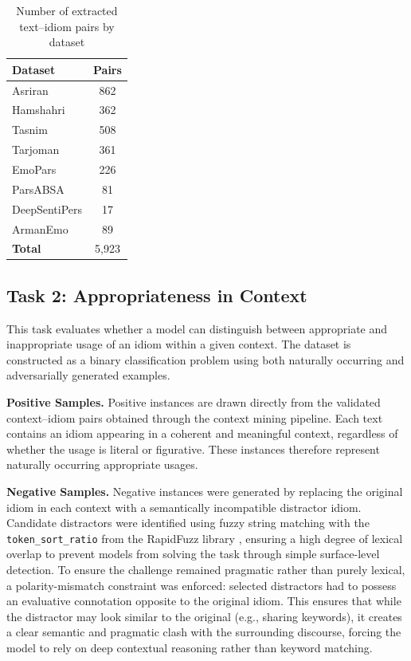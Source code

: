 \documentclass[11pt,a4paper]{article}
\begin{document}
\begin{table}[htbp]
\centering
\caption{Number of extracted text–idiom pairs by dataset}
\label{tab:context_pairs}
\begin{tabular}{lc}
\toprule
\textbf{Dataset} & \textbf{Pairs} \\
\midrule
Asriran & 862 \\
Hamshahri & 362 \\
Tasnim & 508 \\
Tarjoman & 361 \\
EmoPars & 226 \\
ParsABSA & 81 \\
DeepSentiPers & 17 \\
ArmanEmo & 89 \\
\midrule
\textbf{Total} & 5,923 \\
\bottomrule
\end{tabular}
\end{table}

\subsection{Task 2: Appropriateness in Context}
This task evaluates whether a model can distinguish between appropriate and inappropriate usage of an idiom within a given context. The dataset is constructed as a binary classification problem using both naturally occurring and adversarially generated examples.

\textbf{Positive Samples.}
Positive instances are drawn directly from the validated context–idiom pairs obtained through the context mining pipeline. Each text contains an idiom appearing in a coherent and meaningful context, regardless of whether the usage is literal or figurative. These instances therefore represent naturally occurring appropriate usages.

\textbf{Negative Samples.} Negative instances were generated by replacing the original idiom in each context with a semantically incompatible distractor idiom. Candidate distractors were identified using fuzzy string matching with the \texttt{token\_sort\_ratio} from the RapidFuzz library \cite{rapidfuzz_token_set_ratio}, ensuring a high degree of lexical overlap to prevent models from solving the task through simple surface-level detection. To ensure the challenge remained pragmatic rather than purely lexical, a polarity-mismatch constraint was enforced: selected distractors had to possess an evaluative connotation opposite to the original idiom. This ensures that while the distractor may look similar to the original (e.g., sharing keywords), it creates a clear semantic and pragmatic clash with the surrounding discourse, forcing the model to rely on deep contextual reasoning rather than keyword matching.
\end{document}
